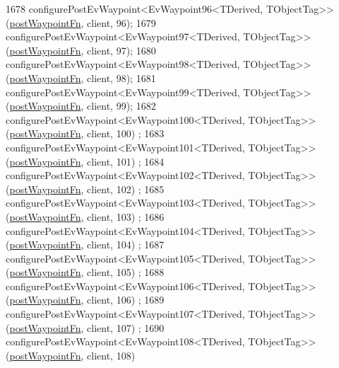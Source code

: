 \begin{DoxyCode}
1678     configurePostEvWaypoint<EvWaypoint96<TDerived, TObjectTag>>(\hyperlink{classcl__move__base__z_1_1WaypointEventDispatcher_a964a57fcce5d48ec60243230722d8dd7}{postWaypointFn}, client, 96);
1679     configurePostEvWaypoint<EvWaypoint97<TDerived, TObjectTag>>(\hyperlink{classcl__move__base__z_1_1WaypointEventDispatcher_a964a57fcce5d48ec60243230722d8dd7}{postWaypointFn}, client, 97);
1680     configurePostEvWaypoint<EvWaypoint98<TDerived, TObjectTag>>(\hyperlink{classcl__move__base__z_1_1WaypointEventDispatcher_a964a57fcce5d48ec60243230722d8dd7}{postWaypointFn}, client, 98);
1681     configurePostEvWaypoint<EvWaypoint99<TDerived, TObjectTag>>(\hyperlink{classcl__move__base__z_1_1WaypointEventDispatcher_a964a57fcce5d48ec60243230722d8dd7}{postWaypointFn}, client, 99);
1682     configurePostEvWaypoint<EvWaypoint100<TDerived, TObjectTag>>(\hyperlink{classcl__move__base__z_1_1WaypointEventDispatcher_a964a57fcce5d48ec60243230722d8dd7}{postWaypointFn}, client, 100)
      ;
1683     configurePostEvWaypoint<EvWaypoint101<TDerived, TObjectTag>>(\hyperlink{classcl__move__base__z_1_1WaypointEventDispatcher_a964a57fcce5d48ec60243230722d8dd7}{postWaypointFn}, client, 101)
      ;
1684     configurePostEvWaypoint<EvWaypoint102<TDerived, TObjectTag>>(\hyperlink{classcl__move__base__z_1_1WaypointEventDispatcher_a964a57fcce5d48ec60243230722d8dd7}{postWaypointFn}, client, 102)
      ;
1685     configurePostEvWaypoint<EvWaypoint103<TDerived, TObjectTag>>(\hyperlink{classcl__move__base__z_1_1WaypointEventDispatcher_a964a57fcce5d48ec60243230722d8dd7}{postWaypointFn}, client, 103)
      ;
1686     configurePostEvWaypoint<EvWaypoint104<TDerived, TObjectTag>>(\hyperlink{classcl__move__base__z_1_1WaypointEventDispatcher_a964a57fcce5d48ec60243230722d8dd7}{postWaypointFn}, client, 104)
      ;
1687     configurePostEvWaypoint<EvWaypoint105<TDerived, TObjectTag>>(\hyperlink{classcl__move__base__z_1_1WaypointEventDispatcher_a964a57fcce5d48ec60243230722d8dd7}{postWaypointFn}, client, 105)
      ;
1688     configurePostEvWaypoint<EvWaypoint106<TDerived, TObjectTag>>(\hyperlink{classcl__move__base__z_1_1WaypointEventDispatcher_a964a57fcce5d48ec60243230722d8dd7}{postWaypointFn}, client, 106)
      ;
1689     configurePostEvWaypoint<EvWaypoint107<TDerived, TObjectTag>>(\hyperlink{classcl__move__base__z_1_1WaypointEventDispatcher_a964a57fcce5d48ec60243230722d8dd7}{postWaypointFn}, client, 107)
      ;
1690     configurePostEvWaypoint<EvWaypoint108<TDerived, TObjectTag>>(\hyperlink{classcl__move__base__z_1_1WaypointEventDispatcher_a964a57fcce5d48ec60243230722d8dd7}{postWaypointFn}, client, 108)

\end{DoxyCode}
